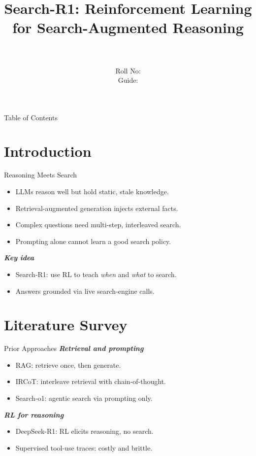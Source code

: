 \documentclass{beamer}
\title[\seminarShortTitle]{Search-R1: Reinforcement Learning for Search-Augmented Reasoning}
\author[\seminarName\ (\seminarShortCollege)]{\seminarName \\ \seminarRoll \\ Roll No: \seminarClassRoll \\ Guide: \seminarGuide}
\institute[\seminarShortCollege]{\seminarDept \\ \seminarCollege}
\date{\seminarDate}
\begin{document}
\begin{frame}\titlepage\end{frame}
\begin{frame}{Table of Contents}\tableofcontents\end{frame}
\section{Introduction}
\begin{frame}{Reasoning Meets Search}
\begin{itemize}
\item LLMs reason well but hold static, stale knowledge.
\item Retrieval-augmented generation injects external facts.
\item Complex questions need multi-step, interleaved search.
\item Prompting alone cannot learn a good search policy.
\end{itemize}
\textbf{\textit{Key idea}}
\begin{itemize}
\item Search-R1: use RL to teach \emph{when} and \emph{what} to search.
\item Answers grounded via live search-engine calls.
\end{itemize}
\end{frame}

\section{Literature Survey}
\begin{frame}{Prior Approaches}
\textbf{\textit{Retrieval and prompting}}
\begin{itemize}
\item RAG: retrieve once, then generate.
\item IRCoT: interleave retrieval with chain-of-thought.
\item Search-o1: agentic search via prompting only.
\end{itemize}
\textbf{\textit{RL for reasoning}}
\begin{itemize}
\item DeepSeek-R1: RL elicits reasoning, no search.
\item Supervised tool-use traces: costly and brittle.
\end{itemize}
\end{frame}
\end{document}
